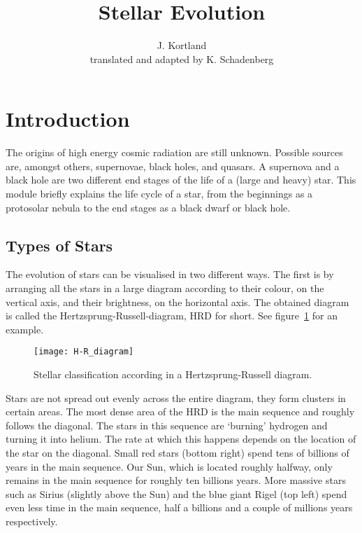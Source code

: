 



\author{J. Kortland \\ translated and adapted by K. Schadenberg}
\date{}
\title{Stellar Evolution}



\maketitle

\section{Introduction}
The origins of high energy cosmic radiation are still unknown. Possible sources are, amongst others, supernovae, black holes, and quasars. A supernova and a black hole are two different end stages of the life of a (large and heavy) star. This module briefly explains the life cycle of a star, from the beginnings as a protosolar nebula to the end stages as a black dwarf or black hole.

\subsection{Types of Stars}
The evolution of stars can be visualised in two different ways. The first is by arranging all the stars in a large diagram according to their colour, on the vertical axis, and their brightness, on the horizontal axis. The obtained diagram is called the Hertzsprung-Russell-diagram, HRD for short. See figure~\ref{fig:HRD_1} for an example.

\begin{figure}\begin{center}
\texttt{[image: H-R\_diagram]}
\caption{Stellar classification according in a Hertzsprung-Russell diagram.\protect\footnotemark}\label{fig:HRD_1}
\end{center}\end{figure}

Stars are not spread out evenly across the entire diagram, they form clusters in certain areas. The most dense area of the HRD is the main sequence and roughly follows the diagonal. The stars in this sequence are `burning' hydrogen and turning it into helium. The rate at which this happens depends on the location of the star on the diagonal. Small red stars (bottom right) spend tens of billions of years in the main sequence. Our Sun, which is located roughly halfway, only remains in the main sequence for roughly ten billions years. More massive stars such as Sirius (slightly above the Sun) and the blue giant Rigel (top left) spend even less time in the main sequence, half a billions and a couple of millions years respectively.

